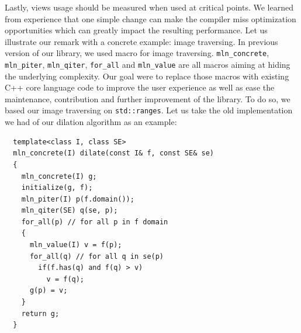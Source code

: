 Lastly, views usage should be measured when used at critical points. We learned from experience that one simple change
can make the compiler miss optimization opportunities which can greatly impact the resulting performance. Let us
illustrate our remark with a concrete example: image traversing. In previous version of our library, we used macro for
image traversing. \texttt{mln\_concrete}, \texttt{mln\_piter}, \texttt{mln\_qiter}, \texttt{for\_all} and
\texttt{mln\_value} are all macros aiming at hiding the underlying complexity. Our goal were to replace those macros
with existing C++ core language code to improve the user experience as well as ease the maintenance, contribution and
further improvement of the library. To do so, we based our image traversing on \texttt{std::ranges}. Let us take the old
implementation we had of our dilation algorithm as an example:
\begin{verbatim}
  template<class I, class SE>
  mln_concrete(I) dilate(const I& f, const SE& se)
  {
    mln_concrete(I) g;
    initialize(g, f);
    mln_piter(I) p(f.domain());
    mln_qiter(SE) q(se, p);
    for_all(p) // for all p in f domain
    {
      mln_value(I) v = f(p);
      for_all(q) // for all q in se(p)
        if(f.has(q) and f(q) > v)
          v = f(q);
      g(p) = v;
    }
    return g;
  }
\end{verbatim}

